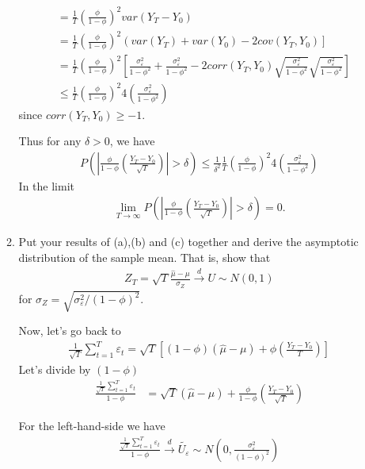 \documentclass[a4paper]{scrartcl}
\begin{document}
\begin{enumerate}
\begin{enumerate}
\begin{solution}
\begin{align*}
		&= \frac{1}{T}\left(\frac{\phi}{1-\phi}\right)^2 var(Y_T - Y_0)\\
		&= \frac{1}{T}\left(\frac{\phi}{1-\phi}\right)^2 \left(var(Y_T) + var(Y_0) - 2 cov(Y_T,Y_0)\right]\\
		&= \frac{1}{T}\left(\frac{\phi}{1-\phi}\right)^2 \left[\frac{\sigma_\varepsilon^2}{1-\phi^2} + \frac{\sigma_\varepsilon^2}{1-\phi^2} - 2 corr(Y_T,Y_0)\sqrt{\frac{\sigma_\varepsilon^2}{1-\phi^2}}\sqrt{\frac{\sigma_\varepsilon^2}{1-\phi^2}} \right]\\
		&\leq \frac{1}{T}\left(\frac{\phi}{1-\phi}\right)^2 4 \left(\frac{\sigma_\varepsilon^2}{1-\phi^2}\right)
		\end{align*}
		since $corr(Y_T,Y_0) \geq -1$.
		
		Thus for any $\delta>0$, we have
		\begin{align*}
		P\left(\left|\frac{\phi}{1-\phi}\left(\frac{Y_T - Y_0}{\sqrt{T}}\right)\right|> \delta\right) \leq \frac{1}{\delta^2} \frac{1}{T}\left(\frac{\phi}{1-\phi}\right)^2 4 \left(\frac{\sigma_\varepsilon^2}{1-\phi^2}\right)
		\end{align*}
		In the limit
		\begin{align*}
		\lim_{T\rightarrow \infty} P\left(\left|\frac{\phi}{1-\phi}\left(\frac{Y_T - Y_0}{\sqrt{T}}\right)\right|> \delta\right) = 0.
		\end{align*}
		\end{solution}
		\item Put your results of (a),(b) and (c) together and derive the asymptotic distribution of the sample mean. That is, show that
		\begin{align*}
		Z_{T} =\sqrt{T}\frac{\hat{\mu} -\mu }{\sigma_Z} \overset{d}{\rightarrow} U \sim N(0,1)
		\end{align*}
		for $\sigma_Z=\sqrt{\sigma_\varepsilon^2/(1-\phi)^2}$.
		\begin{solution}
		Now, let's go back to
		\begin{align*}
		\frac{1}{\sqrt{T}} \sum_{t=1}^T \varepsilon_t = \sqrt{T}\left[(1-\phi)\left(\hat{\mu}-\mu\right) + \phi\left(\frac{Y_T - Y_0}{T}\right)\right]
		\end{align*}
		Let's divide by $(1-\phi)$
		\begin{align*}
		\frac{\frac{1}{\sqrt{T}} \sum_{t=1}^T \varepsilon_t}{1-\phi} & = \sqrt{T}\left(\hat{\mu}-\mu\right) + \frac{\phi}{1-\phi}\left(\frac{Y_T - Y_0}{\sqrt{T}}\right)
		\end{align*}
		
		For the left-hand-side we have
		\begin{align*}
		\frac{\frac{1}{\sqrt{T}} \sum_{t=1}^T \varepsilon_t}{1-\phi} \overset{d}{\rightarrow} \tilde{U_\varepsilon} \sim N\left(0,\frac{\sigma_\varepsilon^2}{(1-\phi)^2}\right)
		\end{align*}
		

\end{solution}
\end{enumerate}
\end{enumerate}
\end{document}
